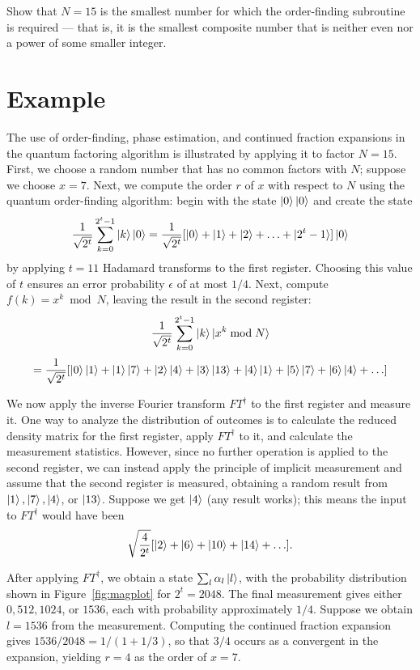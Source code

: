 \begin{example}
    Show that $N = 15$ is the smallest number for which the order-finding subroutine is required — that is, it is the smallest composite number that is neither even nor a power of some smaller integer.
\end{example}

\section{Example}

The use of order-finding, phase estimation, and continued fraction expansions in the quantum factoring algorithm is illustrated by applying it to factor $N = 15$. First, we choose a random number that has no common factors with $N$; suppose we choose $x = 7$. Next, we compute the order $r$ of $x$ with respect to $N$ using the quantum order-finding algorithm: begin with the state $\ket{0}\ket{0}$ and create the state
\[
\frac{1}{\sqrt{2^t}} \sum_{k=0}^{2^t - 1} \ket{k}\ket{0} = \frac{1}{\sqrt{2^t}} [\ket{0} + \ket{1} + \ket{2} + \ldots + \ket{2^t - 1}]\ket{0}
\]
by applying $t = 11$ Hadamard transforms to the first register. Choosing this value of $t$ ensures an error probability $\epsilon$ of at most $1/4$. Next, compute $f(k) = x^k \bmod N$, leaving the result in the second register:
\[
\frac{1}{\sqrt{2^t}} \sum_{k=0}^{2^t - 1} \ket{k}\ket{x^k \bmod N}
\]
\[
= \frac{1}{\sqrt{2^t}} [\ket{0}\ket{1} + \ket{1}\ket{7} + \ket{2}\ket{4} + \ket{3}\ket{13} + \ket{4}\ket{1} + \ket{5}\ket{7} + \ket{6}\ket{4} + \ldots]
\]

We now apply the inverse Fourier transform $FT^{\dagger}$ to the first register and measure it. One way to analyze the distribution of outcomes is to calculate the reduced density matrix for the first register, apply $FT^{\dagger}$ to it, and calculate the measurement statistics. However, since no further operation is applied to the second register, we can instead apply the principle of implicit measurement and assume that the second register is measured, obtaining a random result from $\ket{1}, \ket{7}, \ket{4}$, or $\ket{13}$. Suppose we get $\ket{4}$ (any result works); this means the input to $FT^{\dagger}$ would have been
\[
\sqrt{\frac{4}{2^t}} [\ket{2} + \ket{6} + \ket{10} + \ket{14} + \ldots ].
\]

After applying $FT^{\dagger}$, we obtain a state $\sum_l \alpha_l \ket{l}$, with the probability distribution shown in Figure~\ref{fig:magplot} for $2^t = 2048$. The final measurement gives either $0, 512, 1024$, or $1536$, each with probability approximately $1/4$. Suppose we obtain $l = 1536$ from the measurement. Computing the continued fraction expansion gives $1536/2048 = 1/(1 + 1/3)$, so that $3/4$ occurs as a convergent in the expansion, yielding $r = 4$ as the order of $x = 7$.

